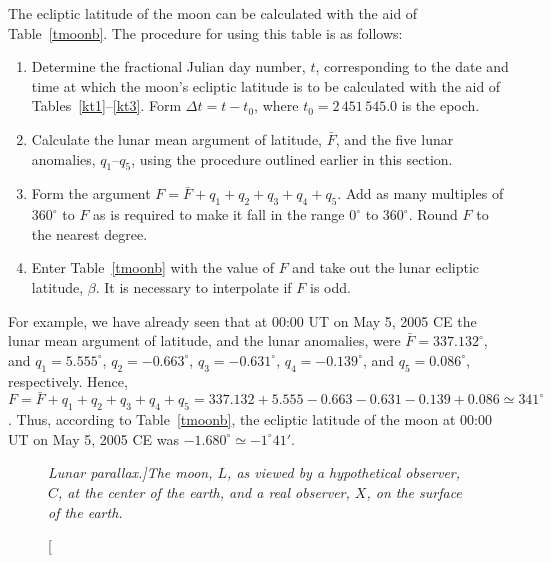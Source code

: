 The ecliptic latitude of the moon can be calculated with the aid of Table~\ref{tmoonb}. The procedure for using this table is as follows:
\begin{enumerate}
 \item Determine the fractional Julian day number, $t$, corresponding to the date and time
at which the moon's ecliptic latitude is to be calculated with the aid of Tables~\ref{kt1}--\ref{kt3}. Form $\Delta t = t-t_0$, where $t_0=2\,451\,545.0$ is the epoch. 
\item Calculate the lunar mean argument of latitude, $\bar{F}$, 
and the five lunar anomalies, $q_1$--$q_5$, using the procedure outlined earlier in this 
section.
\item Form the argument $F = \bar{F}+q_1+q_2+q_3+q_4+q_5$. Add as many multiples of $360^\circ$ to $F$ as is required to make it fall in the range
$0^\circ$ to $360^\circ$. Round $F$ to the nearest degree.
\item Enter Table~\ref{tmoonb} with the value of $F$
and take out the lunar ecliptic latitude, $\beta$. It is necessary to
interpolate if $F$ is odd.
\end{enumerate}

For example, we have already seen that at 00:00 UT on May 5, 2005 CE
the lunar mean argument of latitude, and
the lunar anomalies, were $\bar{F}=337.132^\circ$, and
$q_1=5.555^\circ$, $q_2=-0.663^\circ$, $q_3=-0.631^\circ$, $q_4=-0.139^\circ$,
and $q_5=0.086^\circ$, respectively. Hence, $F=\bar{F}+q_1+q_2+q_3+q_4+q_5
=337.132+5.555-0.663-0.631-0.139+0.086\simeq 341^\circ$. Thus, according to Table~\ref{tmoonb}, the ecliptic latitude
of the moon at  00:00 UT on May 5, 2005 CE was $-1.680^\circ\simeq -1^\circ 41'$.

\begin{figure}
\epsfysize=3in
\centerline{}
\caption[\em Lunar parallax.]{\em The moon, $L$, as viewed by a hypothetical observer, $C$,
at the center of the earth,  and a real observer, $X$, on the
surface of the earth.}\label{fpara}
\end{figure}

